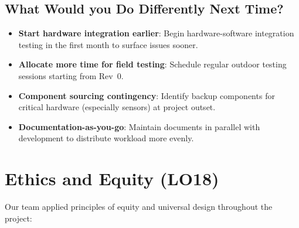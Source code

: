 \documentclass{article}
\begin{document}
\subsection{What Would you Do Differently Next Time?}

\begin{itemize}
  \item \textbf{Start hardware integration earlier}: Begin hardware-software
        integration testing in the first month to surface issues sooner.
  \item \textbf{Allocate more time for field testing}: Schedule regular outdoor
        testing sessions starting from Rev~0.
  \item \textbf{Component sourcing contingency}: Identify backup components for
        critical hardware (especially sensors) at project outset.
  \item \textbf{Documentation-as-you-go}: Maintain documents in parallel with
        development to distribute workload more evenly.
\end{itemize}

\section{Ethics and Equity (LO18)}

Our team applied principles of equity and universal design throughout the
project:
\end{document}
